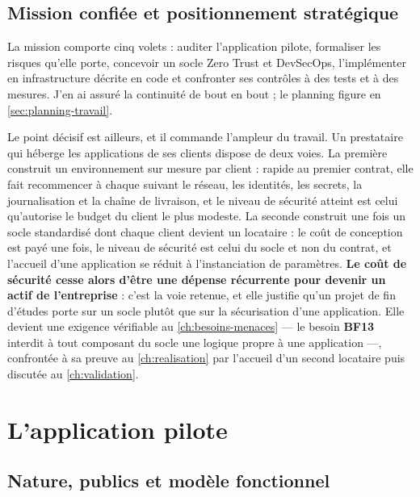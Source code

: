 \subsection{Mission confiée et positionnement stratégique}
\label{subsec:mission-confiee}

La mission comporte cinq volets : auditer l'application pilote, formaliser les risques qu'elle
porte, concevoir un socle Zero Trust et DevSecOps, l'implémenter en infrastructure décrite en code
et confronter ses contrôles à des tests et à des mesures. J'en ai assuré la continuité de bout en
bout ; le planning figure en \cref{sec:planning-travail}.

Le point décisif est ailleurs, et il commande l'ampleur du travail. Un prestataire qui héberge
les applications de ses clients dispose de deux voies. La première construit un environnement sur
mesure par client : rapide au premier contrat, elle fait recommencer à chaque suivant le réseau,
les identités, les secrets, la journalisation et la chaîne de livraison, et le niveau de sécurité
atteint est celui qu'autorise le budget du client le plus modeste. La seconde construit une fois
un socle standardisé dont chaque client devient un locataire : le coût de conception est payé une
fois, le niveau de sécurité est celui du socle et non du contrat, et l'accueil d'une application
se réduit à l'instanciation de paramètres. \textbf{Le coût de sécurité cesse alors d'être une
dépense récurrente pour devenir un actif de l'entreprise} : c'est la voie retenue, et elle
justifie qu'un projet de fin d'études porte sur un socle plutôt que sur la sécurisation d'une
application. Elle devient une exigence vérifiable au \cref{ch:besoins-menaces} --- le besoin
\textbf{BF13} interdit à tout composant du socle une logique propre à une application ---,
confrontée à sa preuve au \cref{ch:realisation} par l'accueil d'un second locataire puis
discutée au \cref{ch:validation}.

\section{L'application pilote}
\label{sec:etude-existant}

\subsection{Nature, publics et modèle fonctionnel}
\label{subsec:appli-pilote}

